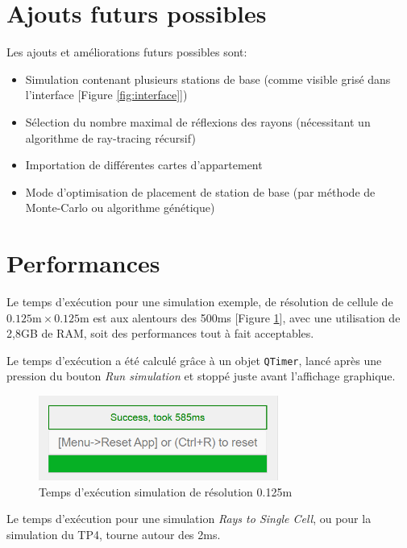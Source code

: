 \section{Ajouts futurs possibles}
Les ajouts et améliorations futurs possibles sont:
\begin{itemize}
    \item Simulation contenant plusieurs stations de base (comme visible grisé dans l'interface [Figure \ref{fig:interface}])
    \item Sélection du nombre maximal de réflexions des rayons (nécessitant un algorithme de ray-tracing récursif)
    \item Importation de différentes cartes d'appartement
    \item Mode d'optimisation de placement de station de base (par méthode de Monte-Carlo ou algorithme génétique)
\end{itemize}

\section{Performances}
Le temps d'exécution pour une simulation exemple, de résolution de cellule de $0.125\mathrm{m}\times0.125\mathrm{m}$ est aux alentours des 500ms [Figure \ref{fig:time-0.125m}], avec une utilisation de 2,8GB de RAM, soit des performances tout à fait acceptables.

Le temps d'exécution a été calculé grâce à un objet \texttt{QTimer}, lancé après une pression du bouton \textit{Run simulation} et stoppé juste avant l'affichage graphique.
\begin{figure}[H]
    \centering
    \includegraphics[width=0.7\textwidth]{latex/images/time-0.125m.png}
    \caption{Temps d'exécution simulation de résolution 0.125m}
    \label{fig:time-0.125m}
\end{figure}

Le temps d'exécution pour une simulation \textit{Rays to Single Cell}, ou pour la simulation du TP4, tourne autour des 2ms.
